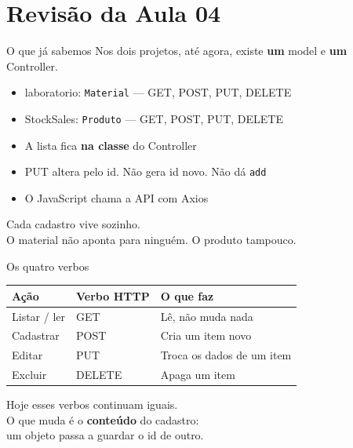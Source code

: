 \documentclass[aspectratio=169,11pt]{beamer}
\begin{document}
\section{Revisão da Aula 04}

\begin{frame}{O que já sabemos}
  Nos dois projetos, até agora, existe \textbf{um} model
  e \textbf{um} Controller.

  \vspace{0.5em}
  \begin{itemize}
    \item laboratorio: \texttt{Material} --- GET, POST, PUT, DELETE
    \item StockSales: \texttt{Produto} --- GET, POST, PUT, DELETE
    \item A lista fica \textbf{na classe} do Controller
    \item PUT altera pelo id. Não gera id novo. Não dá \texttt{add}
    \item O JavaScript chama a API com Axios
  \end{itemize}

  \vspace{0.5em}
  Cada cadastro vive sozinho.\\
  O material não aponta para ninguém. O produto tampouco.
\end{frame}

\begin{frame}{Os quatro verbos}
  \begin{center}
  \begin{tabular}{lll}
    \toprule
    Ação & Verbo HTTP & O que faz \\
    \midrule
    Listar / ler & GET & Lê, não muda nada \\
    Cadastrar & POST & Cria um item novo \\
    Editar & PUT & Troca os dados de um item \\
    Excluir & DELETE & Apaga um item \\
    \bottomrule
  \end{tabular}
  \end{center}

  \vspace{0.7em}
  Hoje esses verbos continuam iguais.\\
  O que muda é o \textbf{conteúdo} do cadastro:\\
  um objeto passa a guardar o id de outro.
\end{frame}
\end{document}
